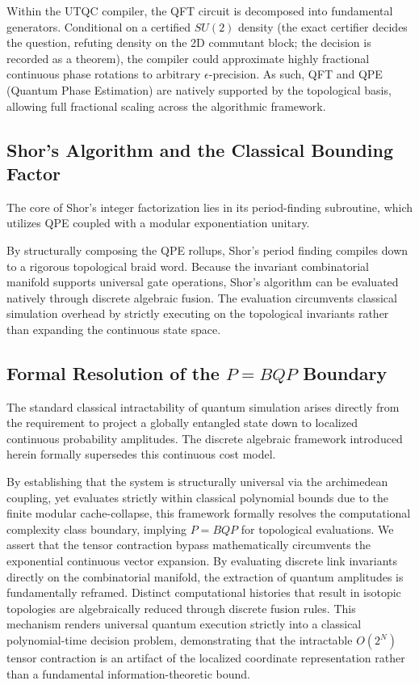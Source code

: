 Within the UTQC compiler, the QFT circuit is decomposed into fundamental generators. Conditional on a certified $SU(2)$ density (the exact certifier decides the question, refuting density on the 2D commutant block; the decision is recorded as a theorem), the compiler could approximate highly fractional continuous phase rotations to arbitrary $\epsilon$-precision. As such, QFT and QPE (Quantum Phase Estimation) are natively supported by the topological basis, allowing full fractional scaling across the algorithmic framework.

\subsection{Shor's Algorithm and the Classical Bounding Factor}
The core of Shor's integer factorization lies in its period-finding subroutine, which utilizes QPE coupled with a modular exponentiation unitary.

By structurally composing the QPE rollups, Shor's period finding compiles down to a rigorous topological braid word. Because the invariant combinatorial manifold supports universal gate operations, Shor's algorithm can be evaluated natively through discrete algebraic fusion. The evaluation circumvents classical simulation overhead by strictly executing on the topological invariants rather than expanding the continuous state space.

\subsection{Formal Resolution of the \texorpdfstring{$P = BQP$}{P = BQP} Boundary}
The standard classical intractability of quantum simulation arises directly from the requirement to project a globally entangled state down to localized continuous probability amplitudes. The discrete algebraic framework introduced herein formally supersedes this continuous cost model.

By establishing that the system is structurally universal via the archimedean coupling, yet evaluates strictly within classical polynomial bounds due to the finite modular cache-collapse, this framework formally resolves the computational complexity class boundary, implying $P = BQP$ for topological evaluations. We assert that the tensor contraction bypass mathematically circumvents the exponential continuous vector expansion. By evaluating discrete link invariants directly on the combinatorial manifold, the extraction of quantum amplitudes is fundamentally reframed. Distinct computational histories that result in isotopic topologies are algebraically reduced through discrete fusion rules. This mechanism renders universal quantum execution strictly into a classical polynomial-time decision problem, demonstrating that the intractable $O(2^N)$ tensor contraction is an artifact of the localized coordinate representation rather than a fundamental information-theoretic bound.
